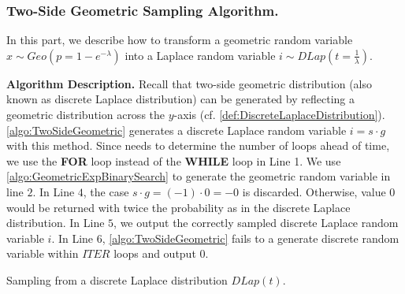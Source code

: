 \subsubsection{Two-Side Geometric Sampling Algorithm.}
\label{subsubsec:TwoSideGeometricSamplingAlgorithm}
In this part, we describe how to transform a geometric random variable $x \sim Geo\left(p=1-e^{-\lambda}\right) $ into a Laplace random variable $i\sim DLap\left(t=\frac{1}{\lambda}\right) $.

\textbf{Algorithm Description.}
Recall that two-side geometric distribution (also known as discrete Laplace distribution) can be generated by reflecting a geometric distribution across the $y$-axis (cf. \autoref{def:DiscreteLaplaceDistribution}).
\autoref{algo:TwoSideGeometric} generates a discrete Laplace random variable $i=s\cdot g$ with this method. Since \smpc needs to determine the number of loops ahead of time, we use the \textbf{FOR} loop instead of the \textbf{WHILE} loop in Line 1.
We use \autoref{algo:GeometricExpBinarySearch} to generate the geometric random variable in line $2$.
In Line $4$, the case $s\cdot g =\left(-1\right)\cdot 0 =-0$ is discarded. Otherwise, value $0$ would be returned with twice the probability as in the discrete Laplace distribution.
In Line $5$, we output the correctly sampled discrete Laplace random variable $i$.
In Line $6$, \autoref{algo:TwoSideGeometric} fails to a generate discrete random variable within $ITER$ loops and output $0$.

\begin{algorithm}[tbh!]
    \centering
    \caption{Sampling from a discrete Laplace distribution $ DLap\left(t\right) $.}
    \label{algo:TwoSideGeometric}
\end{algorithm}
\FloatBarrier

